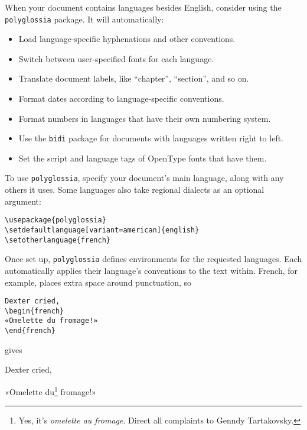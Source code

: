 When your document contains languages besides English,
consider using the \texttt{polyglossia} package.
It will automatically:
\begin{itemize}
\item Load language-specific hyphenations and other conventions.
\item Switch between user-specified fonts for each language.
\item Translate document labels,
    like ``chapter''\quotekern, ``section''\quotekern, and so on.
\item Format dates according to language-specific conventions.
\item Format numbers in languages that have their own numbering system.
\item Use the \texttt{bidi} package for documents with languages written
    right to left.
\item Set the script and language tags of OpenType fonts that have them.
\end{itemize}
To use \texttt{polyglossia}, specify your document's main language,
along with any others it uses.
Some languages also take regional dialects as an optional argument:
\begin{leftfigure}
\begin{lstlisting}
\usepackage{polyglossia}
\setdefaultlanguage[variant=american]{english}
\setotherlanguage{french}
\end{lstlisting}
\end{leftfigure}
Once set up,
\texttt{polyglossia} defines environments for the requested languages.
Each automatically applies their language's conventions to the text within.
French, for example, places extra space around punctuation, so
\begin{leftfigure}
\begin{lstlisting}
Dexter cried,
\begin{french}
«Omelette du fromage!»
\end{french}
\end{lstlisting}
\end{leftfigure}
gives
\begin{leftfigure}
\lm%
Dexter cried,
\begin{french}
\lm%
«Omelette du\footnote{Yes, it's \emph{omelette au fromage}.
Direct all complaints to Genndy Tartakovsky.} fromage!»
\end{french}
\end{leftfigure}


